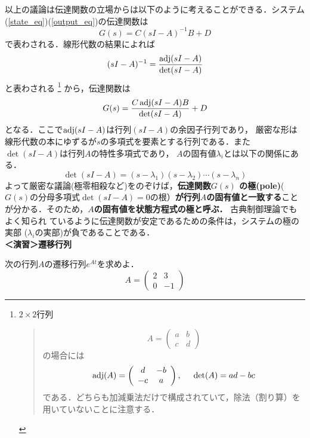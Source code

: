 以上の議論は伝達関数の立場からは以下のように考えることができる．システム
(\ref{state_eq})(\ref{output_eq})の伝達関数は
\begin{equation}
 G(s) = C ( sI - A )^{-1} B + D
\end{equation}
で表わされる．線形代数の結果によれば
\begin{equation}
 (s I - A)^{-1} 
  = \frac{\mathop{\rm adj}\nolimits (s I - A)}{\mathop{\rm det}\nolimits (s I - A )}
\end{equation}
と表わされる
\footnote{
$2 \times 2$行列
\begin{quote}
\[
	A= \left(\begin{array}{cc}
		a & b \\
		c & d
	   \end{array} \right )
\]
の場合には
\[
	\mathop{\rm adj}\nolimits(A) = 
		\left(\begin{array}{cc}
			d & -b \\
			-c & a
		\end{array} \right )
	, \hspace{5mm}
	\mathop{\rm det}\nolimits(A)= ad -bc
\]
である．どちらも加減乗法だけで構成されていて，除法（割り算）を用いていないことに注意する．
\end{quote}
}
から，伝達関数は
\begin{equation}
 G(s) 
  = \frac{C \mathop{\rm adj}\nolimits (s I - A)B}{\mathop{\rm det}\nolimits (s I - A )}
  + D
\end{equation}
となる．ここで$\mathop{\rm adj}\nolimits (s I - A)$は行列$(s I - A)$の余因子行列であり，
厳密な形は線形代数の本にゆずるが$s$の多項式を要素とする行列である．また
$\det (s I - A)$は行列$A$の特性多項式であり，
$A$の固有値$\lambda_i$とは以下の関係にある．
\begin{equation}
 \det (s I - A)
  = (s - \lambda_1)(s - \lambda_2)\cdots(s - \lambda_n)
\end{equation}
よって厳密な議論(極零相殺など)をのぞけば，{\bf 伝達関数$G(s)$
の極(pole)}($G(s)$の分母多項式$\det (s I - A)=0$の根）{\bf が行列$A$の固有値と一致する}ことが分かる．そのため，{\bf $A$の固有値を状態方程式の極と呼ぶ．}
古典制御理論でもよく知られ
ているように伝達関数が安定であるための条件は，システムの極の実部
($\lambda_i$の実部)が負であることである．
\\

\noindent
{\bf ＜演習＞遷移行列} \nopagebreak

次の行列$A$の遷移行列$e^{At}$を求めよ．
\[
	A= \left(\begin{array}{cc}
		2 & 3 \\
		0 & -1
	   \end{array} \right )
\]



